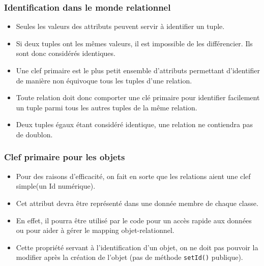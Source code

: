 \documentclass[xcolor=pdftex,x11names,table]{beamer}
\begin{document}
   	\begin{frame}
    \frametitle{Identification dans le monde relationnel}
		  \begin{itemize}
		  	\item Seules les valeurs des attributs peuvent servir à identifier un tuple.
		  	\item Si deux tuples ont les mêmes valeurs, il est impossible de les différencier. 
		  	Ils sont donc considérés identiques.
		  	\item Une clef primaire est le plus petit ensemble d'attributs permettant d'identifier de manière non équivoque 
		  	tous les tuples d'une relation.
				\item Toute relation doit donc comporter une clé primaire pour identifier facilement un tuple parmi tous les 
				autres tuples de la même relation.
				\item Deux tuples égaux étant considéré identique, une relation ne contiendra pas de doublon.
		  \end{itemize}	
   	\end{frame}

   	\begin{frame}
    \frametitle{Clef primaire pour les objets}
		  \begin{itemize}
		  	\item Pour des raisons d'efficacité, on fait en sorte que les relations aient une clef simple(un Id numérique).
		  	\item Cet attribut devra être représenté dans une donnée membre de chaque classe.
		  	\item En effet, il pourra être utilisé par le code pour un accès rapide aux données ou pour aider à gérer 
		  	le mapping objet-relationnel.
				\item Cette propriété servant à l'identification d'un objet, on ne doit pas pouvoir la modifier après la création de 
				l'objet (pas de méthode \lstinline$setId()$ publique).
		  \end{itemize}	
   	\end{frame}
   	
\end{document}
